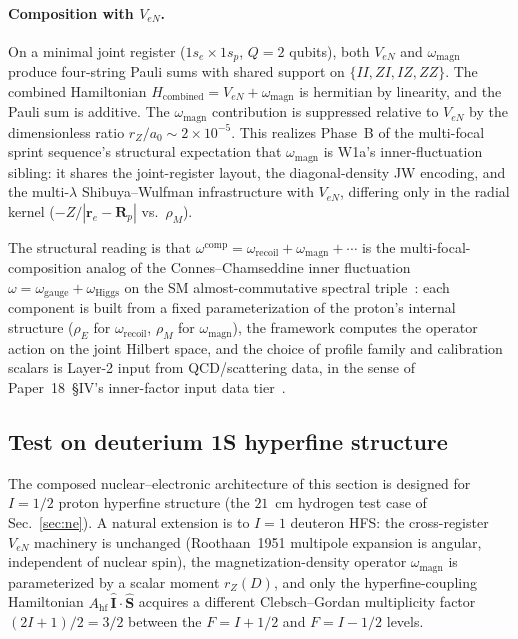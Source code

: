 \documentclass[twocolumn,prc,amsmath,amssymb,superscriptaddress]{revtex4-2}
\begin{document}
\paragraph{Composition with $V_{eN}$.}
On a minimal joint register ($1s_e \times 1s_p$, $Q = 2$ qubits), both
$V_{eN}$ and $\omega_{\mathrm{magn}}$ produce four-string Pauli sums
with shared support on $\{II, ZI, IZ, ZZ\}$. The combined Hamiltonian
$H_{\mathrm{combined}} = V_{eN} + \omega_{\mathrm{magn}}$ is hermitian
by linearity, and the Pauli sum is additive. The
$\omega_{\mathrm{magn}}$ contribution is suppressed relative to $V_{eN}$
by the dimensionless ratio $r_Z / a_0 \sim 2 \times 10^{-5}$. This
realizes Phase~B of the multi-focal sprint sequence's structural
expectation that $\omega_{\mathrm{magn}}$ is W1a's
inner-fluctuation sibling: it shares the joint-register layout, the
diagonal-density JW encoding, and the multi-$\lambda$ Shibuya--Wulfman
infrastructure with $V_{eN}$, differing only in the radial kernel
($-Z/|\mathbf{r}_e - \mathbf{R}_p|$ vs.~$\rho_M$).

The structural reading is that $\omega^{\mathrm{comp}}
= \omega_{\mathrm{recoil}} + \omega_{\mathrm{magn}} + \cdots$ is the
multi-focal-composition analog of the Connes--Chamseddine inner
fluctuation $\omega = \omega_{\mathrm{gauge}} + \omega_{\mathrm{Higgs}}$
on the SM almost-commutative spectral
triple~\cite{ChamseddineConnes2010,Paper32}: each component is built
from a fixed parameterization of the proton's internal structure
($\rho_E$ for $\omega_{\mathrm{recoil}}$, $\rho_M$ for
$\omega_{\mathrm{magn}}$), the framework computes the operator action
on the joint Hilbert space, and the choice of profile family and
calibration scalars is Layer-2 input from QCD/scattering data, in the
sense of Paper~18~\S IV's inner-factor input data
tier~\cite{Paper18}.

\subsection{Test on deuterium 1S hyperfine structure}
\label{ssec:cross-deuterium-hfs}

The composed nuclear--electronic architecture of this section is
designed for $I=1/2$ proton hyperfine structure (the $21$~cm hydrogen
test case of Sec.~\ref{sec:ne}). A natural extension is to $I=1$
deuteron HFS: the cross-register $V_{eN}$ machinery is unchanged
(Roothaan~1951 multipole expansion is angular, independent of nuclear
spin), the magnetization-density operator $\omega_{\mathrm{magn}}$ is
parameterized by a scalar moment $r_Z(D)$, and only the
hyperfine-coupling Hamiltonian $A_\text{hf}\,\hat{\mathbf{I}}\cdot
\hat{\mathbf{S}}$ acquires a different Clebsch--Gordan multiplicity
factor $(2I+1)/2 = 3/2$ between the $F = I + 1/2$ and $F = I - 1/2$
levels.
\end{document}
